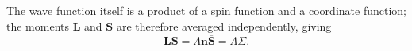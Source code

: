 The wave function itself is a product of a spin function and a coordinate function; the moments $\mathbf L$ and $\mathbf S$ are therefore averaged independently, giving
\[\overline{\mathbf{LS}}=\Lambda\mathbf n\overline{\mathbf S}=\Lambda\Sigma.\]
